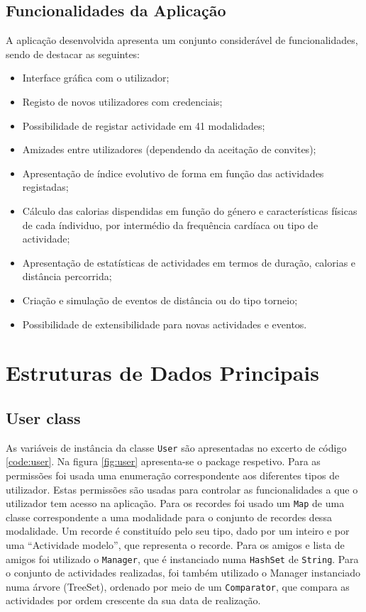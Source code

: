 \documentclass[a4paper,10pt]{report}
\begin{document}
\section{Funcionalidades da Aplicação}
\label{sec:funcionalidades}
A aplicação desenvolvida apresenta um conjunto considerável de funcionalidades, sendo de destacar as seguintes:

\begin{itemize}
 \item Interface gráfica com o utilizador;
 \item Registo de novos utilizadores com credenciais;
 \item Possibilidade de registar actividade em 41 modalidades;
 \item Amizades entre utilizadores (dependendo da aceitação de convites);
 \item Apresentação de índice evolutivo de forma em função das actividades registadas;
 \item Cálculo das calorias dispendidas em função do género e características físicas de cada índividuo, 
	  por intermédio da frequência cardíaca ou tipo de actividade;
 \item Apresentação de estatísticas de actividades em termos de duração, calorias e distância percorrida;
 \item Criação e simulação de eventos de distância ou do tipo torneio;
 \item Possibilidade de extensibilidade para novas actividades e eventos.
\end{itemize}

\chapter{Estruturas de Dados Principais}
\label{cap:estruturas}
\section{User class}
\label{sec:user}
As variáveis de instância da classe \verb!User! são apresentadas no excerto de código \ref{code:user}.
Na figura \ref{fig:user} apresenta-se o package respetivo.
Para as permissões foi usada uma enumeração correspondente aos diferentes tipos de utilizador. 
Estas permissões são usadas para controlar as funcionalidades a que o utilizador tem acesso na aplicação.
Para os recordes foi usado um \verb!Map! de uma classe correspondente a uma modalidade para o conjunto de recordes dessa modalidade. 
Um recorde é constituído pelo seu tipo, dado por um inteiro e por uma ``Actividade modelo'', que representa o recorde.
Para os amigos e lista de amigos foi utilizado o \verb!Manager!, que é instanciado numa \verb!HashSet! de \verb!String!.
Para o conjunto de actividades realizadas, foi também utilizado o Manager instanciado numa árvore (TreeSet), ordenado por meio 
de um \verb!Comparator!, que compara as actividades por ordem crescente da sua data de realização.
\end{document}
